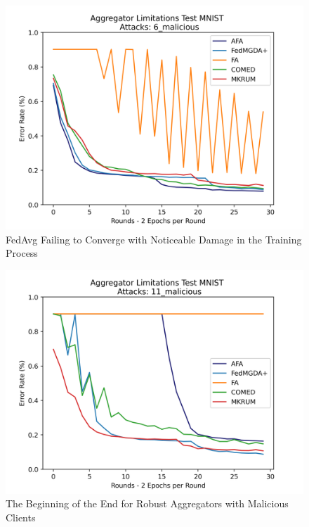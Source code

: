 \begin{figure}[htbp]
	\centering
    \includegraphics[scale=0.5]{initial/graphs/6_malicious.png}
	\caption{FedAvg Failing to Converge with Noticeable Damage in the Training Process}
	\label{fig:6mal}
\end{figure}

\begin{figure}[htbp]
	\centering
    \includegraphics[scale=0.5]{initial/graphs/11_malicious.png}
	\caption{The Beginning of the End for Robust Aggregators with Malicious Clients}
	\label{fig:11mal}
\end{figure}

